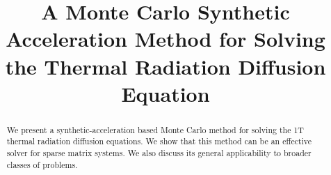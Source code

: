\documentclass[preprint,12pt]{elsarticle}
\begin{document}
\begin{frontmatter}



  \title{A Monte Carlo Synthetic Acceleration Method for Solving the
    Thermal Radiation Diffusion Equation}


  \author{}

  \address{}

  \begin{abstract}

    We present a synthetic-acceleration based Monte Carlo method for
    solving the 1T thermal radiation diffusion equations.  We show
    that this method can be an effective solver for sparse matrix
    systems.  We also discuss its general applicability to broader
    classes of problems.

  \end{abstract}

  \begin{keyword}


  \end{keyword}

\end{frontmatter}
\end{document}
